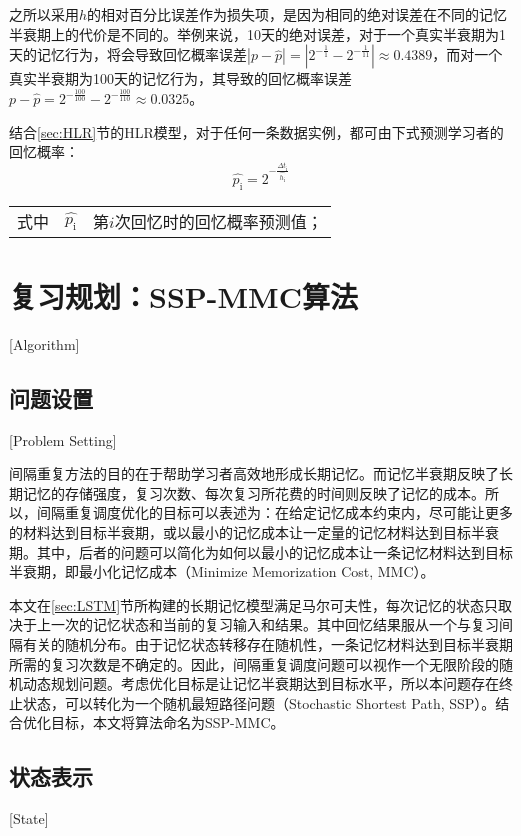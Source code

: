 之所以采用$h$的相对百分比误差作为损失项，是因为相同的绝对误差在不同的记忆半衰期上的代价是不同的。举例来说，10天的绝对误差，对于一个真实半衰期为1天的记忆行为，将会导致回忆概率误差$|p-\hat{p}|=|2^{-\frac{1}{1}}-2^{-\frac{1}{11}}|\approx 0.4389$，而对一个真实半衰期为100天的记忆行为，其导致的回忆概率误差$p-\hat{p}=2^{-\frac{100}{100}}-2^{-\frac{100}{110}}\approx 0.0325$。

结合\ref{sec:HLR}节的HLR模型，对于任何一条数据实例，都可由下式预测学习者的回忆概率：
\begin{equation}
    \hat{p_\mathrm{i}}=2^{-\frac{\Delta t_\mathrm{i}}{\hat{h_\mathrm{i}}}}
\end{equation}
\begin{tabularx}{\textwidth}{@{}l@{\quad}r@{———}X@{}}
    式中& $\hat{p_\mathrm{i}}$ &第$i$次回忆时的回忆概率预测值；
\end{tabularx}\vspace{3.15bp}

\section{复习规划：SSP-MMC算法}[Algorithm]

\subsection{问题设置}[Problem Setting]

间隔重复方法的目的在于帮助学习者高效地形成长期记忆。而记忆半衰期反映了长期记忆的存储强度，复习次数、每次复习所花费的时间则反映了记忆的成本。所以，间隔重复调度优化的目标可以表述为：在给定记忆成本约束内，尽可能让更多的材料达到目标半衰期，或以最小的记忆成本让一定量的记忆材料达到目标半衰期。其中，后者的问题可以简化为如何以最小的记忆成本让一条记忆材料达到目标半衰期，即最小化记忆成本（Minimize Memorization Cost, MMC）。

本文在\ref{sec:LSTM}节所构建的长期记忆模型满足马尔可夫性，每次记忆的状态只取决于上一次的记忆状态和当前的复习输入和结果。其中回忆结果服从一个与复习间隔有关的随机分布。由于记忆状态转移存在随机性，一条记忆材料达到目标半衰期所需的复习次数是不确定的。因此，间隔重复调度问题可以视作一个无限阶段的随机动态规划问题。考虑优化目标是让记忆半衰期达到目标水平，所以本问题存在终止状态，可以转化为一个随机最短路径问题\cite[177-182]{bertsekasReinforcementLearningOptimal2019}（Stochastic Shortest Path, SSP）。结合优化目标，本文将算法命名为SSP-MMC。

\subsection{状态表示}[State]

